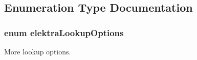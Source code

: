 \subsection{Enumeration Type Documentation}
\hypertarget{group__proposal_ga93673533c4c8eb1fdfca76b98c5f49b0}{
\subsubsection[{elektra\+Lookup\+Options}]{\setlength{\rightskip}{0pt plus 5cm}enum {\bf elektra\+Lookup\+Options}}}\label{group__proposal_ga93673533c4c8eb1fdfca76b98c5f49b0}


More lookup options. 

